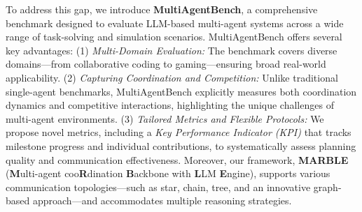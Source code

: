 

To address this gap, we introduce \textbf{MultiAgentBench}, a comprehensive benchmark designed to evaluate LLM-based multi-agent systems across a wide range of task-solving and simulation scenarios. MultiAgentBench offers several key advantages: (1) \textit{Multi-Domain Evaluation:} The benchmark covers diverse domains—from collaborative coding to gaming—ensuring broad real-world applicability. (2) \textit{Capturing Coordination and Competition:} Unlike traditional single-agent benchmarks, MultiAgentBench explicitly measures both coordination dynamics and competitive interactions, highlighting the unique challenges of multi-agent environments. (3) \textit{Tailored Metrics and Flexible Protocols:} We propose novel metrics, including a \textit{Key Performance Indicator (KPI)} that tracks milestone progress and individual contributions, to systematically assess planning quality and communication effectiveness. Moreover, our framework, \textbf{MARBLE} (\textbf{M}ulti-agent coo\textbf{R}dination \textbf{B}ackbone with \textbf{L}LM \textbf{E}ngine), supports various communication topologies—such as star, chain, tree, and an innovative graph-based approach—and accommodates multiple reasoning strategies.

